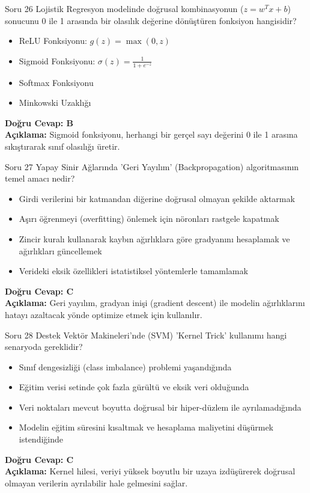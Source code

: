 \documentclass[12pt,a4paper]{article}
\begin{document}
\begin{testcard}{Soru 26}
    Lojistik Regresyon modelinde doğrusal kombinasyonun ($z = w^T x + b$) sonucunu 0 ile 1 arasında bir olasılık değerine dönüştüren fonksiyon hangisidir?
    \begin{itemize}
        \item[A)] ReLU Fonksiyonu: $g(z) = \max(0, z)$
        \item[B)] Sigmoid Fonksiyonu: $\sigma(z) = \frac{1}{1 + e^{-z}}$
        \item[C)] Softmax Fonksiyonu
        \item[D)] Minkowski Uzaklığı
    \end{itemize}
    \tcblower
    \textbf{Doğru Cevap: B} \\
    \textbf{Açıklama:} Sigmoid fonksiyonu, herhangi bir gerçel sayı değerini 0 ile 1 arasına sıkıştırarak sınıf olasılığı üretir.
\end{testcard}

\begin{testcard}{Soru 27}
    Yapay Sinir Ağlarında 'Geri Yayılım' (Backpropagation) algoritmasının temel amacı nedir?
    \begin{itemize}
        \item[A)] Girdi verilerini bir katmandan diğerine doğrusal olmayan şekilde aktarmak
        \item[B)] Aşırı öğrenmeyi (overfitting) önlemek için nöronları rastgele kapatmak
        \item[C)] Zincir kuralı kullanarak kaybın ağırlıklara göre gradyanını hesaplamak ve ağırlıkları güncellemek
        \item[D)] Verideki eksik özellikleri istatistiksel yöntemlerle tamamlamak
    \end{itemize}
    \tcblower
    \textbf{Doğru Cevap: C} \\
    \textbf{Açıklama:} Geri yayılım, gradyan inişi (gradient descent) ile modelin ağırlıklarını hatayı azaltacak yönde optimize etmek için kullanılır.
\end{testcard}

\begin{testcard}{Soru 28}
    Destek Vektör Makineleri'nde (SVM) 'Kernel Trick' kullanımı hangi senaryoda gereklidir?
    \begin{itemize}
        \item[A)] Sınıf dengesizliği (class imbalance) problemi yaşandığında
        \item[B)] Eğitim verisi setinde çok fazla gürültü ve eksik veri olduğunda
        \item[C)] Veri noktaları mevcut boyutta doğrusal bir hiper-düzlem ile ayrılamadığında
        \item[D)] Modelin eğitim süresini kısaltmak ve hesaplama maliyetini düşürmek istendiğinde
    \end{itemize}
    \tcblower
    \textbf{Doğru Cevap: C} \\
    \textbf{Açıklama:} Kernel hilesi, veriyi yüksek boyutlu bir uzaya izdüşürerek doğrusal olmayan verilerin ayrılabilir hale gelmesini sağlar.
\end{testcard}
\end{document}
